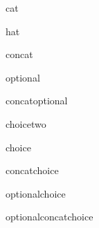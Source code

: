 \documentclass[10pt,letterpaper]{article}
\begin{document}
\newlength{\tmplength}
\newlength{\tmplengthb}
\newlength{\tmplengthc}
\setlength{\tmplength}{12pt}
\setlength{\tmplengthb}{12pt}
\setlength{\tmplengthc}{12pt}





\begin{figure}
  \centerline{\usebox{\catBox}}
  \caption{cat}
  \label{fig:cat}
\end{figure}

\begin{figure}
  \centerline{\usebox{\hatBox}}
  \caption{hat}
  \label{fig:hat}
\end{figure}

\begin{figure}
  \centerline{\usebox{\concatBox}}
  \caption{concat}
  \label{fig:concat}
\end{figure}

\begin{figure}
  \centerline{\usebox{\optionalBox}}
  \caption{optional}
  \label{fig:optional}
\end{figure}

\begin{figure}
  \centerline{\usebox{\concatoptionalBox}}
  \caption{concatoptional}
  \label{fig:concatoptional}
\end{figure}

\begin{figure}
  \centerline{\usebox{\choicetwoBox}}
  \caption{choicetwo}
  \label{fig:choicetwo}
\end{figure}

\begin{figure}
  \centerline{\usebox{\choiceBox}}
  \caption{choice}
  \label{fig:choice}
\end{figure}


\begin{figure}
  \centerline{\usebox{\concatchoiceBox}}
  \caption{concatchoice}
  \label{fig:concatchoice}
\end{figure}


\begin{figure}
  \centerline{\usebox{\optionalchoiceBox}}
  \caption{optionalchoice}
  \label{fig:optionalchoice}
\end{figure}

\begin{figure}
  \centerline{\usebox{\optionalconcatchoiceBox}}
  \caption{optionalconcatchoice}
  \label{fig:optionalconcatchoice}
\end{figure}
\end{document}
